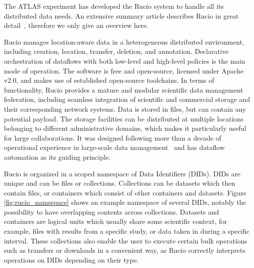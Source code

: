 \documentclass[11pt]{article}
\begin{document}
The ATLAS experiment has developed the Rucio system to handle all its distributed data needs. An extensive summary article describes Rucio in great detail~\cite{rucio}, therefore we only give an overview here.

Rucio manages location-aware data in a heterogeneous distributed environment, including creation, location, transfer, deletion, and annotation. Declarative orchestration of dataflows with both low-level and high-level policies is the main mode of operation. The software is free and open-source, licensed under Apache v2.0, and makes use of established open-source toolchains. In terms of functionality, Rucio provides a mature and modular scientific data management federation, including seamless integration of scientific and commercial storage and their corresponding network systems. Data is stored in files, but can contain any potential payload. The storage facilities can be distributed at multiple locations belonging to different administrative domains, which makes it particularly useful for large collaborations. It was designed following more than a decade of operational experience in large-scale data management~\cite{dq} and has dataflow automation as its guiding principle.

Rucio is organized in a scoped namespace of Data Identifiers (DIDs). DIDs are unique and can be files or collections. Collections can be datasets which then contain files, or containers which consist of other containers and datasets. Figure \ref{fig:rucio_namespace} shows an example namespace of several DIDs, notably the possibility to have overlapping contents across collections. Datasets and containers are logical units which usually share some scientific context, for example, files with results from a specific study, or data taken in during a specific interval. These collections also enable the user to execute certain bulk operations such as transfers or downloads in a convenient way, as Rucio correctly interprets operations on DIDs depending on their type.
\end{document}
